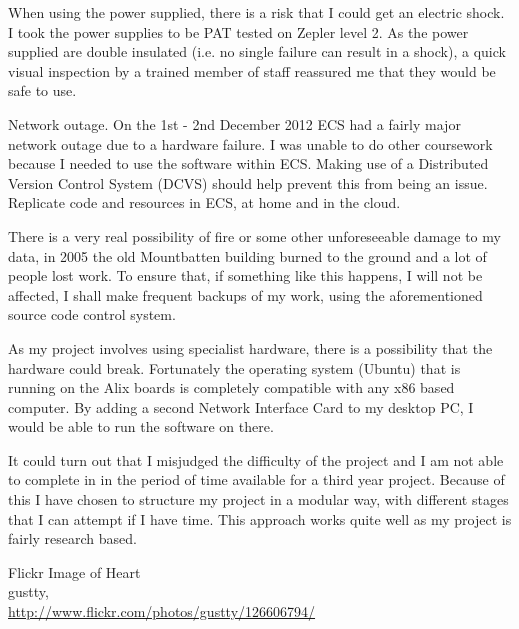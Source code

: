 \documentclass[12pt]{report}
\begin{document}
When using the power supplied, there is a risk that I could get an electric
shock. I took the power supplies to be PAT tested on Zepler level 2. As the
power supplied are double insulated (i.e. no single failure can result in a
shock), a quick visual inspection by a trained member of staff reassured me that
they would be safe to use. 

Network outage. On the 1st - 2nd December 2012 ECS had a fairly major network
outage due to a hardware failure. I was unable to do other coursework because I
needed to use the software within ECS. Making use of a Distributed Version
Control System (DCVS) should help prevent this from being an issue. Replicate
code and resources in ECS, at home and in the cloud. 

There is a very real possibility of fire or some other unforeseeable damage to my
data, in 2005 the old Mountbatten building burned to the ground and a lot of
people lost work. To ensure that, if something like this happens, I will not be
affected, I shall make frequent backups of my work, using the aforementioned
source code control system.

As my project involves using specialist hardware, there is a possibility that
the hardware could break. Fortunately the operating system (Ubuntu) that is running on
the Alix boards is completely compatible with any x86 based computer. By adding
a second Network Interface Card to my desktop PC, I would be able to run the
software on there. 

It could turn out that I misjudged the difficulty of the project and I am not
able to complete in in the period of time available for a third year project.
Because of this I have chosen to structure my project in a modular way, with
different stages that I can attempt if I have time. This approach works quite
well as my project is fairly research based. 


\pagebreak


\begin{thebibliography}{9}


	Flickr Image of Heart \\
	gustty,\\
	\url{http://www.flickr.com/photos/gustty/126606794/}


\end{thebibliography}
\end{document}

